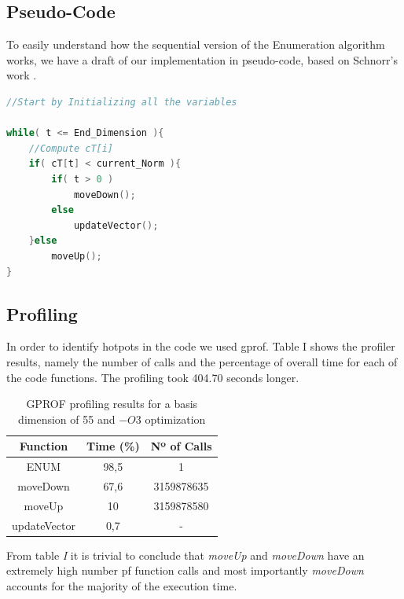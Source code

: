 \documentclass[conference]{IEEEtran}
\begin{document}
\subsection{Pseudo-Code}
To easily understand how the sequential version of the Enumeration algorithm works, we have a draft of our implementation in pseudo-code, based on Schnorr's work \cite{schnorr}.


\begin{lstlisting}[frame=single,language=C]
//Start by Initializing all the variables

while( t <= End_Dimension ){
    //Compute cT[i]
    if( cT[t] < current_Norm ){
        if( t > 0 )
            moveDown();
        else
            updateVector();
    }else
        moveUp();
}
\end{lstlisting}

\subsection{Profiling}
In order to identify hotpots in the code we used gprof. Table I shows the profiler results, namely the number of calls and the percentage of overall time for each of the code functions.
The profiling took 404.70 seconds longer.

\begin{table}[ht!]
\centering
\label{my-label}

\begin{tabular}{|c|c|c|}
\hline
\rowcolor[HTML]{C0C0C0} 
{\color[HTML]{000000} Function} & {\color[HTML]{000000} Time (\%)} & {\color[HTML]{000000} Nº of Calls} \\ \hline
ENUM                            & 98,5                             & 1                                  \\ \hline
moveDown                        & 67,6                             & 3159878635                         \\ \hline
moveUp                          & 10                               & 3159878580                         \\ \hline
updateVector                    & 0,7                              & -                                  \\ \hline
\end{tabular}
\caption{GPROF profiling results for a basis dimension of 55 and $-O3$ optimization}
\end{table}

From table \emph{I} it is trivial to conclude that \emph{moveUp} and \emph{moveDown} have an extremely high number pf function calls and most importantly \emph{moveDown} accounts for the majority of the execution time.
\end{document}
